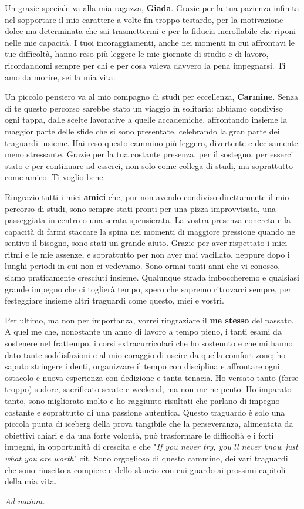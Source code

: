 Un grazie speciale va alla mia ragazza, \textbf{Giada}. Grazie per la tua pazienza infinita nel sopportare il mio carattere a volte fin troppo testardo, per la motivazione dolce ma determinata che sai trasmettermi e per la fiducia incrollabile che riponi nelle mie capacità. I tuoi incoraggiamenti, anche nei momenti in cui affrontavi le tue difficoltà, hanno reso più leggere le mie giornate di studio e di lavoro, ricordandomi sempre per chi e per cosa valeva davvero la pena impegnarsi. Ti amo da morire, sei la mia vita.

\separator

Un piccolo pensiero va al mio compagno di studi per eccellenza, \textbf{Carmine}. Senza di te questo percorso sarebbe stato un viaggio in solitaria: abbiamo condiviso ogni tappa, dalle scelte lavorative a quelle accademiche, affrontando insieme la maggior parte delle sfide che si sono presentate, celebrando la gran parte dei traguardi insieme. Hai reso questo cammino più leggero, divertente e decisamente meno stressante. Grazie per la tua costante presenza, per il sostegno, per esserci stato e per continuare ad esserci, non solo come collega di studi, ma soprattutto come amico. Ti voglio bene.

\separator

Ringrazio tutti i miei \textbf{amici} che, pur non avendo condiviso direttamente il mio percorso di studi, sono sempre stati pronti per una pizza improvvisata, una passeggiata in centro o una serata spensierata. La vostra presenza concreta e la capacità di farmi staccare la spina nei momenti di maggiore pressione quando ne sentivo il bisogno, sono stati un grande aiuto. Grazie per aver rispettato i miei ritmi e le mie assenze, e soprattutto per non aver mai vacillato, neppure dopo i lunghi periodi in cui non ci vedevamo. Sono ormai tanti anni che vi conosco, siamo praticamente cresciuti insieme. Qualunque strada imboccheremo e qualsiasi grande impegno che ci toglierà tempo, spero che sapremo ritrovarci sempre, per festeggiare insieme altri traguardi come questo, miei e vostri.

\separator

Per ultimo, ma non per importanza, vorrei ringraziare il \textbf{me stesso} del passato. A quel me che, nonostante un anno di lavoro a tempo pieno, i tanti esami da sostenere nel frattempo, i corsi extracurricolari che ho sostenuto e che mi hanno dato tante soddisfazioni e al mio coraggio di uscire da quella comfort zone; ho saputo stringere i denti, organizzare il tempo con disciplina e affrontare ogni ostacolo e nuova esperienza con dedizione e tanta tenacia. Ho versato tanto (forse troppo) sudore, sacrificato serate e weekend, ma non me ne pento. Ho imparato tanto, sono migliorato molto e ho raggiunto risultati che parlano di impegno costante e soprattutto di una passione autentica. Questo traguardo è solo una piccola punta di iceberg della prova tangibile che la perseveranza, alimentata da obiettivi chiari e da una forte volontà, può trasformare le difficoltà e i forti impegni, in opportunità di crescita e che "\textit{If you never try, you'll never know just what you are worth}" cit.  Sono orgoglioso di questo cammino, dei vari traguardi che sono riuscito a compiere e dello slancio con cui guardo ai prossimi capitoli della mia vita.

\begin{flushright}
\textit{Ad maiora.}
\end{flushright}
\endgroup